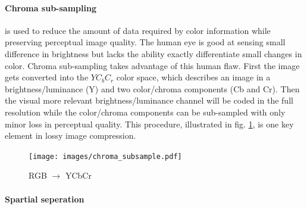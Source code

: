 
\paragraph{Chroma sub-sampling} is used to reduce the amount of data required by
color information while preserving perceptual image quality. 
The human eye is good at sensing small difference in brightness but lacks the
ability exactly differentiate small changes in color. Chroma sub-sampling takes
advantage of this human flaw. First the image gets converted into the $YC_bC_r$
color space, which describes an image in a brightness/luminance (Y) and two
color/chroma components (Cb and Cr). Then the visual more relevant
brightness/luminance channel will be coded in the full resolution while the
color/chroma components can be sub-sampled with only minor loss in perceptual
quality. This procedure, illustrated in fig. \ref{fig:YCbCr}, is one key element
in lossy image compression. 
\begin{figure}[h]
\centering
\texttt{[image: images/chroma\_subsample.pdf]}
\label{fig:YCbCr}
\caption{RGB $\rightarrow$ YCbCr}
\end{figure}


\paragraph{Spartial seperation}

